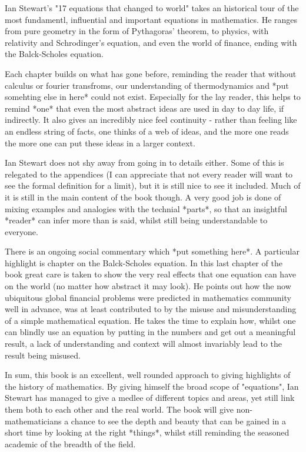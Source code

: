 \documentclass[article,11pt]{memoir}
\begin{document}
Ian Stewart's "17 equations that changed to world" takes an historical tour of the most fundamentl, influential and important equations in mathematics. He ranges from pure geometry in the form of Pythagoras' theorem, to physics, with relativity and Schrodinger's equation, and even the world of finance, ending with the Balck-Scholes equation.

Each chapter builds on what has gone before, reminding the reader that without calculus or fourier transfroms, our understanding of thermodynamics and *put somehting else in here* could not exist. Especially for the lay reader, this helps to remind *one* that even the most abstract ideas are used in day to day life, if indirectly. It also gives an incredibly nice feel continuity - rather than feeling like an endless string of facts, one thinks of a web of ideas, and the more one reads the more one can put these ideas in a larger context.

Ian Stewart does not shy away from going in to details either. Some of this is relegated to the appendices (I can appreciate that not every reader will want to see the formal definition for a limit), but it is still nice to see it included. Much of it is still in the main content of the book though. A very good job is done of mixing examples and analogies with the technial *parts*, so that an insightful *reader* can infer more than is said, whilst still being understandable to everyone.

There is an ongoing social commentary which *put something here*. A particular highlight is chapter on the Balck-Scholes equation. In this last chapter of the book great care is taken to show the very real effects that one equation can have on the world (no matter how abstract it may look). He points out how the now ubiquitous global financial problems were predicted in mathematics community well in advance, was at least contributed to by the misuse and misunderstanding of a simple mathematical equation. He takes the time to explain how, whilst one can blindly use an equation by putting in the numbers and get out a meaningful result, a lack of understanding and context will almost invariably lead to the result being misused. 

In sum, this book is an excellent, well rounded approach to giving highlights of the history of mathematics. By giving himself the broad scope of "equations", Ian Stewart has managed to give a medlee of different topics and areas, yet still link them both to each other and the real world. The book will give non-mathematicians a chance to see the depth and beauty that can be gained in a short time by looking at the right *things*, whilst still reminding the seasoned academic of the breadth of the field.
\end{document}
